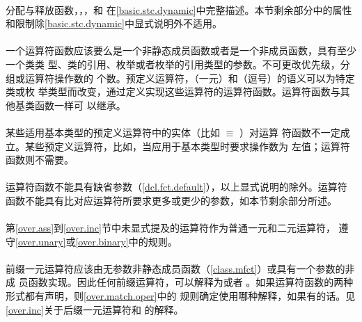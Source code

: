 \paragraph{}
分配与释放函数，，，和
在\ref{basic.stc.dynamic}中完整描述。本节剩余部分中的属性
和限制除\ref{basic.stc.dynamic}中显式说明外不适用。

\paragraph{}
一个运算符函数应该要么是一个非静态成员函数或者是一个非成员函数，具有至少一个类类
型、类的引用、枚举或者枚举的引用类型的参数。不可更改优先级，分组或运算符操作数的
个数。预定义运算符\tm{=}，（一元）\tm{\&}和\tm{,}（逗号）的语义可以为特定类或枚
举类型而改变，通过定义实现这些运算符的运算符函数。运算符函数与其他基类函数一样可
以继承。

\paragraph{}
某些适用基本类型的预定义运算符中的实体（比如 $\equiv$ ）对运算
符函数不一定成立。某些预定义运算符，比如\tm{+=}，当应用于基本类型时要求操作数为
左值；运算符函数则不需要。

\paragraph{}
运算符函数不能具有缺省参数（\ref{dcl.fct.default}），以上显式说明的除外。运算符
函数不能具有比对应运算符所要求更多或更少的参数，如本节剩余部分所述。

\paragraph{}
第\ref{over.ass}到\ref{over.inc}节中未显式提及的运算符作为普通一元和二元运算符，
遵守\ref{over.unary}或\ref{over.binary}中的规则。

\paragraph{}
前缀一元运算符应该由无参数非静态成员函数（\ref{class.mfct}）或具有一个参数的非成
员函数实现。因此任何前缀运算符，可以解释为或者
。如果运算符函数的两种形式都有声明，则\ref{over.match.oper}中的
规则确定使用哪种解释，如果有的话。见\ref{over.inc}关于后缀一元运算符\tm{++}和
\tm{--}的解释。

